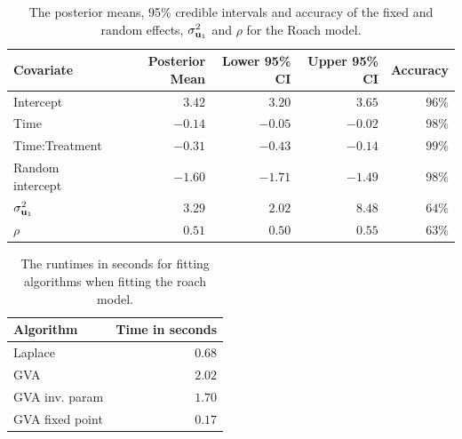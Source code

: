		
		
\begin{table}
	{\footnotesize
	\begin{tabular}{|l|rrrr|}
		\hline
		Covariate          & Posterior Mean & Lower 95\% CI & Upper 95\% CI & Accuracy \\
		\hline
		Intercept          & $3.42$						& $3.20$ 					& $3.65$          & $96\%$     \\
		Time               & $-0.14$        & $-0.05$       & $-0.02$       & $98\%$     \\
		Time:Treatment     & $-0.31$        & $-0.43$       & $-0.14$       & $99\%$     \\
		Random intercept   & $-1.60$        & $-1.71$       & $-1.49$       & $98\%$     \\
		$\sigma^2_{{\bf u}_1}$ & $3.29$           & $2.02$          & $8.48$          & $64\%$     \\
		$\rho$             & $0.51$           & $0.50$          & $0.55$          & $63\%$     \\
		\hline
	\end{tabular}
}
\bigskip
	\caption{The posterior means, 95\% credible intervals and accuracy of the fixed and random
						effects, $\sigma_{{\bf u}_1}^2$ and $\rho$ for the Roach model.}
	\label{tab:application_roaches}
\end{table}

\begin{table}
	{\footnotesize
	\begin{tabular}{|lr|}
	\hline
	Algorithm & Time in seconds \\
	\hline
	Laplace & $0.68$ \\
	GVA & $2.02$ \\
	GVA inv. param & $1.70$ \\
	GVA fixed point & $0.17$ \\
	\hline
	\end{tabular}
}
	\label{tab:application_roaches_runtime}\bigskip
	\caption{The runtimes in seconds for fitting algorithms when fitting the roach model.}
\end{table}
		
